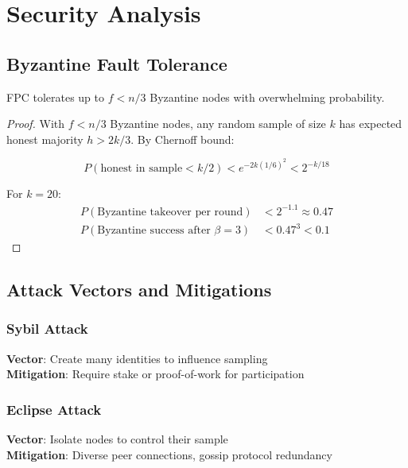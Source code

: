 \section{Security Analysis}

\label{sec:security}

\subsection{Byzantine Fault Tolerance}

\begin{theorem}
FPC tolerates up to $f < n/3$ Byzantine nodes with overwhelming probability.
\end{theorem}

\begin{proof}
With $f < n/3$ Byzantine nodes, any random sample of size $k$ has expected honest majority $h > 2k/3$. By Chernoff bound:

\begin{equation}
P(\text{honest in sample} < k/2) < e^{-2k(1/6)^2} < 2^{-k/18}
\end{equation}

For $k = 20$:
\begin{align}
P(\text{Byzantine takeover per round}) &< 2^{-1.1} \approx 0.47 \\
P(\text{Byzantine success after } \beta = 3) &< 0.47^3 < 0.1
\end{align}
\end{proof}

\subsection{Attack Vectors and Mitigations}

\subsubsection{Sybil Attack}
\textbf{Vector}: Create many identities to influence sampling\\
\textbf{Mitigation}: Require stake or proof-of-work for participation

\subsubsection{Eclipse Attack}
\textbf{Vector}: Isolate nodes to control their sample\\
\textbf{Mitigation}: Diverse peer connections, gossip protocol redundancy

